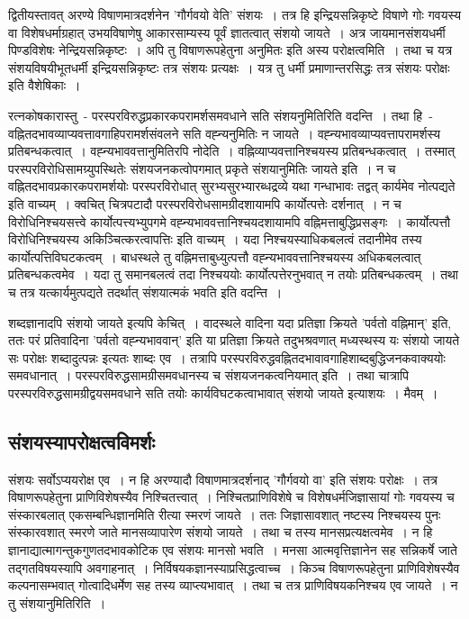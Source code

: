 		द्वितीयस्तावत् अरण्ये विषाणमात्रदर्शनेन 'गौर्गवयो वेति' संशयः~। तत्र हि इन्द्रियसन्निकृष्टे विषाणे गोः गवयस्य वा विशेषधर्माग्रहात् उभयविषाणेषु आकारसाम्यस्य पूर्वं ज्ञातत्वात् संशयो जायते~। अत्र जायमानसंशयधर्मी पिण्डविशेषः नेन्द्रियसन्निकृष्टः~। अपि तु विषाणरूपहेतुना अनुमितः इति अस्य परोक्षत्वमिति~। तथा च यत्र संशयविषयीभूतधर्मी इन्द्रियसन्निकृष्टः तत्र संशयः प्रत्यक्षः~। यत्र तु धर्मी प्रमाणान्तरसिद्धः तत्र संशयः परोक्षः इति वैशेषिकाः~।

		रत्नकोषकारास्तु~- परस्परविरुद्धप्रकारकपरामर्शसमवधाने सति संशयनुमितिरिति वदन्ति~। तथा हि~- वह्नितदभावव्याप्यवत्तावगाहिपरामर्शसंवलने सति वह्न्यनुमितिः न जायते~। वह्न्यभावव्याप्यवत्तापरामर्शस्य प्रतिबन्धकत्वात्~। वह्न्यभाववत्तानुमितिरपि नोदेति~। वह्निव्याप्यवत्तानिश्चयस्य प्रतिबन्धकत्वात्~। तस्मात् परस्परविरोधिसामग्र्युपस्थितेः संशयजनकत्वोपगमात् प्रकृते संशयानुमितिः जायते इति~। न च वह्नितदभावप्रकारकपरामर्शयोः परस्परविरोधात् सुरभ्यसुरभ्यारब्धद्रव्ये यथा गन्धाभावः तद्वत् कार्यमेव नोत्पद्यते इति वाच्यम्~। क्वचित् चित्रपटादौ परस्परविरोधसामग्रीदशायामपि कार्योत्पत्तेः दर्शनात्~। न च विरोधिनिश्चयसत्त्वे कार्योत्पत्त्यभ्युपगमे वह्न्यभाववत्तानिश्चयदशायामपि वह्निमत्ताबुद्धिप्रसङ्गः~। कार्योत्पत्तौ विरोधिनिश्चयस्य अकिञ्चित्करत्वापत्तिः इति वाच्यम्~। यदा निश्चयस्याधिकबलत्वं तदानीमेव तस्य कार्योत्पत्तिविघटकत्वम्~। बाधस्थले तु वह्निमत्ताबुध्युत्पत्तौ वह्न्यभाववत्तानिश्चयस्य अधिकबलत्वात् प्रतिबन्धकत्वमेव~। यदा तु समानबलत्वं तदा निश्चययोः कार्योत्पत्तेरनुभवात् न तयोः प्रतिबन्धकत्वम्~। तथा च तत्र यत्कार्यमुत्पद्यते तदर्थात् संशयात्मकं भवति इति वदन्ति~।

		शब्दज्ञानादपि संशयो जायते इत्यपि केचित्~। वादस्थले वादिना यदा प्रतिज्ञा क्रियते 'पर्वतो वह्निमान्' इति, ततः परं प्रतिवादिना 'पर्वतो वह्न्यभाववान्' इति या प्रतिज्ञा क्रियते तदुभश्रवणात् मध्यस्थस्य यः संशयो जायते सः परोक्षः शब्दादुत्पन्नः इत्यतः शाब्दः एव~। तत्रापि परस्परविरुद्धवह्नितदभावावगाहिशाब्दबुद्धिजनकवाक्ययोः समवधानात्~। परस्परविरुद्धसामग्रीसमवधानस्य च संशयजनकत्वनियमात् इति~। तथा चात्रापि परस्परविरुद्धसामग्रीद्वयसमवधाने सति तयोः कार्यविघटकत्वाभावात् संशयो जायते इत्याशयः~। मैवम्~।

		\subsection{संशयस्यापरोक्षत्वविमर्शः}

		संशयः सर्वोऽप्ययरोक्ष एव~। न हि अरण्यादौ विषाणमात्रदर्शनाद् 'गौर्गवयो वा' इति संशयः परोक्षः~। तत्र विषाणरूपहेतुना प्राणिविशेषस्यैव निश्चितत्त्वात्~। निश्चितप्राणिविशेषे च विशेषधर्मजिज्ञासायां गोः गवयस्य च संस्कारबलात् एकसम्बन्धिज्ञानमिति रीत्या स्मरणं जायते~। ततः जिज्ञासावशात् नष्टस्य निश्चयस्य पुनः संस्कारवशात् स्मरणे जाते मानसव्यापारेण संशयो जायते~। तथा च तस्य मानसप्रत्यक्षत्वमेव~। न हि ज्ञानाद्यात्मागन्तुकगुणतदभावकोटिक  एव संशयः मानसो भवति~। मनसा आत्मवृत्तिज्ञानेन सह सन्निकर्षे जाते तद्गतविषयस्यापि अवगाहनात्~। निर्विषयकज्ञानस्याप्रसिद्धत्वाच्च~। किञ्च विषाणरूपहेतुना प्राणिविशेषस्यैव कल्पनासम्भवात् गोत्वादिधर्मेण सह तस्य व्याप्त्यभावात्~। तथा च तत्र प्राणिविषयकनिश्चय एव जायते~। न तु संशयानुमितिरिति~।

